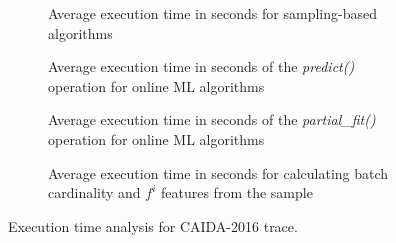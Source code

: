		\begin{figure}[!tb]
			\centering
			\begin{subfigure}{.95\columnwidth}
				\centering
				\small
				
				\caption{Average execution time in seconds for sampling-based algorithms}
				\label{table:time_estimate}
			\end{subfigure}
			\vspace{5mm}
			
			\begin{subfigure}{.95\columnwidth}
				\centering
				\small
				
				\caption{Average execution time in seconds of the \emph{predict()} operation for online ML algorithms}
				\label{table:time_predict}
			\end{subfigure}
			
			\vspace{5mm}
			\begin{subfigure}{.95\columnwidth}
				\centering
				\small
				
				\caption{Average execution time in seconds of the \emph{partial\_fit()} operation for online ML algorithms}
				\label{table:time_fit}
			\end{subfigure}
			
			\vspace{5mm}
			\begin{subfigure}{.95\columnwidth}
				\centering
				\small
				
				\caption{Average execution time in seconds for calculating batch cardinality and $f^i$ features from the sample}
				\label{table:time_features_labels}
			\end{subfigure}
		
			\caption{Execution time analysis for CAIDA-2016 trace.}
			\label{fig:time_analysis}
		\end{figure}
		
